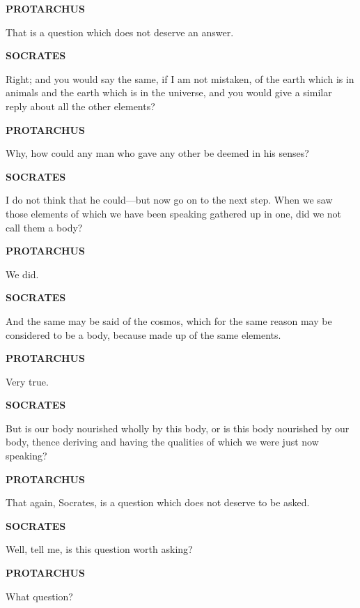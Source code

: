 \documentclass[11pt,letter]{article}
\begin{document}
\par \textbf{PROTARCHUS}
\par   That is a question which does not deserve an answer.

\par \textbf{SOCRATES}
\par   Right; and you would say the same, if I am not mistaken, of the earth which is in animals and the earth which is in the universe, and you would give a similar reply about all the other elements?

\par \textbf{PROTARCHUS}
\par   Why, how could any man who gave any other be deemed in his senses?

\par \textbf{SOCRATES}
\par   I do not think that he could—but now go on to the next step. When we saw those elements of which we have been speaking gathered up in one, did we not call them a body?

\par \textbf{PROTARCHUS}
\par   We did.

\par \textbf{SOCRATES}
\par   And the same may be said of the cosmos, which for the same reason may be considered to be a body, because made up of the same elements.

\par \textbf{PROTARCHUS}
\par   Very true.

\par \textbf{SOCRATES}
\par   But is our body nourished wholly by this body, or is this body nourished by our body, thence deriving and having the qualities of which we were just now speaking?

\par \textbf{PROTARCHUS}
\par   That again, Socrates, is a question which does not deserve to be asked.

\par \textbf{SOCRATES}
\par   Well, tell me, is this question worth asking?

\par \textbf{PROTARCHUS}
\par   What question?
\end{document}
